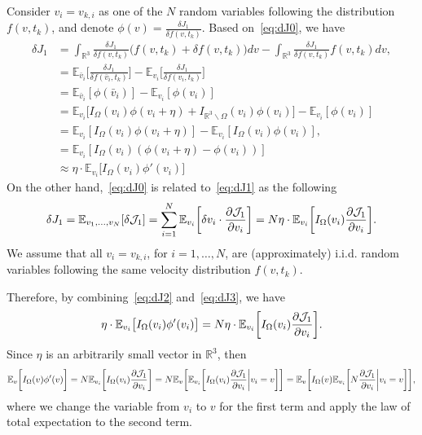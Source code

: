 \documentclass[times,final,nopreprintline]{elsarticle}
\newcommand{\bbR}{\mathbb R} \newcommand{\bbS}{\mathbb S}
\newcommand{\Rthree}{{\bbR^3}}
\begin{document}
Consider $v_i = v_{k,i}$ as one of the $N$ random variables following the distribution $f(v,t_k)$, and denote $\phi(v) =   \frac{\delta J_1}{\delta f(v,t_k)}$. Based on~\eqref{eq:dJ0}, we have
\begin{align}
\delta J_1  &=\int_\Rthree \frac{\delta J_1}{\delta f(v,t_k)} \big( f(v,t_k) +\delta f(v,t_k) \big) dv - \int_\Rthree \frac{\delta J_1}{\delta f(v,t_k)}  f(v,t_k) dv, \nonumber\\
&=  \mathbb E_{\bar{v}_i} \bigg[\frac{\delta J_1}{\delta f(\bar{v}_i,t_k)}\bigg] -  \mathbb E_{v_i} \bigg[\frac{\delta J_1}{\delta f(v_i,t_k)}\bigg] %
\nonumber  \\
&=  \mathbb E_{\bar{v}_i} [\phi(\bar{v}_i)] -  \mathbb E_{v_i} [\phi({v}_i)]%
\nonumber\\
&=  \mathbb E_{ v_i } \big [ I_\Omega(v_i)  \phi( v_i + \eta) + I_{\Rthree\backslash \Omega}(v_i) \phi( v_i) \big] -\mathbb E_{v_i} [\phi({v}_i)]%
\nonumber \\
&=  \mathbb E_{ v_i } [ I_\Omega(v_i)  \phi( v_i + \eta) ] -\mathbb E_{v_i} [I_\Omega(v_i) \phi({v}_i)],\nonumber\\
&=  \mathbb E_{ v_i } [ I_\Omega(v_i)  \left(\phi( v_i + \eta) -\phi(v_i)\right)] \nonumber \\
&\approx   \eta \cdot \mathbb E_{ v_i } \big[ I_\Omega(v_i)  \phi'(v_i) \big]%
\label{eq:dJ2}
\end{align}
On the other hand,~\eqref{eq:dJ0} is related to~\eqref{eq:dJ1} as the following
\begin{equation}\label{eq:dJ3}
    \delta J_1 = \mathbb E_{v_1,\dots,v_N}[\delta \mathcal J_1] =  \sum_{i=1}^N  \mathbb E_{v_i }\bigg[\delta v_i \cdot \frac{\partial \mathcal J_1}{\partial v_i}\bigg] = N \eta \cdot   \mathbb E_{v_i }\bigg[I_\Omega(v_i) \frac{\partial \mathcal J_1}{\partial v_i}\bigg].
\end{equation}
We assume that all $v_i = v_{k,i}$, for $i = 1,\dots,N$, are (approximately) i.i.d. random variables following the same velocity distribution $f(v,t_k)$.

Therefore, by combining~\eqref{eq:dJ2} and~\eqref{eq:dJ3}, we have
\[
\eta \cdot \mathbb E_{ v_i } \big[ I_\Omega(v_i)  \phi'(v_i) \big] = N \eta \cdot   \mathbb E_{v_i }\bigg[I_\Omega(v_i) \frac{\partial \mathcal J_1}{\partial v_i}\bigg].
\]
Since $\eta$ is an arbitrarily small vector in $\Rthree$, then 
\begin{equation*}
  \mathbb E_v \bigg[ I_\Omega(v)\phi'(v) \bigg] =N \mathbb E_{v_i }\bigg[ I_\Omega(v_i) \frac{\partial \mathcal J_1}{\partial v_i}\bigg]
  = N\mathbb E_v  \bigg[  \mathbb E_{v_i} \bigg[I_\Omega(v_i) \frac{\partial \mathcal J_1}{\partial v_i} \bigg| v_i = v \bigg] \bigg] = \mathbb E_v \bigg[ I_\Omega(v) \mathbb E_{v_i} \bigg[N \frac{\partial \mathcal J_1}{\partial v_i} \bigg| v_i = v \bigg] \bigg],
\end{equation*}
where we change the variable from $v_i$ to $v$ for the first term and apply the law of total expectation to the second term.
\end{document}
